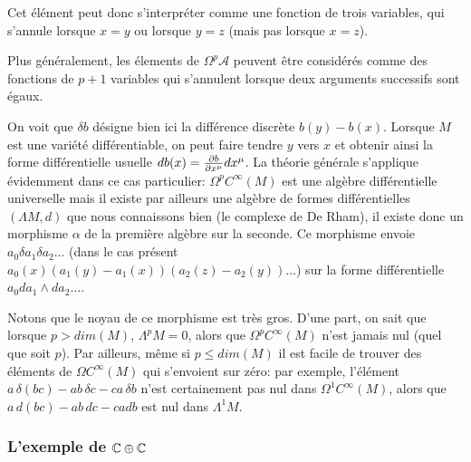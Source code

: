 Cet \'el\'ement peut donc s'interpr\'eter comme une fonction de trois 
variables, qui s'annule lorsque $x = y$ ou lorsque $y = z$ (mais pas 
lorsque $x = z$).

Plus g\'en\'eralement, les \'elements de $\Omega^{p}{\mathcal A}$ peuvent 
\^etre consid\'er\'es comme des fonctions de $p+1$ variables qui s'annulent lorsque deux arguments 
successifs sont \'egaux.  
 
On voit que $\delta b$  d\'esigne bien ici la diff\'erence 
discr\`ete $b(y) - b(x)$. Lorsque $M$ est une vari\'et\'e diff\'erentiable, on 
peut faire tendre $y$ vers $x$ et obtenir ainsi la forme 
diff\'erentielle usuelle $db(x) = {\partial b \over \partial x^\mu} dx^\mu$.
La th\'eorie g\'en\'erale s'applique \'evidemment dans ce cas particulier: 
$\Omega^{p}{C^\infty (M)}$ est une alg\`ebre diff\'erentielle universelle 
mais il existe par ailleurs une alg\`ebre de formes diff\'erentielles 
$(\Lambda M,d)$ que nous connaissons bien (le complexe de De Rham),  
il existe donc un morphisme $\alpha$ de la premi\`ere alg\`ebre sur la 
seconde. Ce morphisme envoie $a_{0} \delta a_{1}\delta a_{2}\ldots $ 
(dans le cas pr\'esent $a_{0}(x) (a_{1}(y)-a_{1}(x))( a_{2}(z)-a_{2}(y) )
\ldots $) sur la forme diff\'erentielle $a_{0} da_{1}\wedge da_{2}\ldots $.

Notons que le noyau de ce morphisme est tr\`es gros. D'une part, on 
sait que lorsque $p > dim (M)$, $\Lambda^p M = 0$, alors que 
$\Omega^{p}{C^\infty (M)}$ n'est jamais nul (quel que soit $p$). Par 
ailleurs, m\^eme si $p \leq dim (M)$ il est facile de trouver des 
\'el\'ements de $\Omega{C^\infty (M)}$ qui s'envoient sur z\'ero: par 
exemple, l'\'el\'ement $a \, \delta (bc) - ab \, \delta c - ca \, \delta b$ n'est 
certainement pas nul dans $\Omega^{1}{C^\infty (M)}$, alors que
$a \,  d (bc) - ab \, d c - ca d b$ est nul dans 
$\Lambda^{1}M$.


	\subsubsection{L'exemple de $\mathbb{C} \oplus \mathbb{C}$}
	
